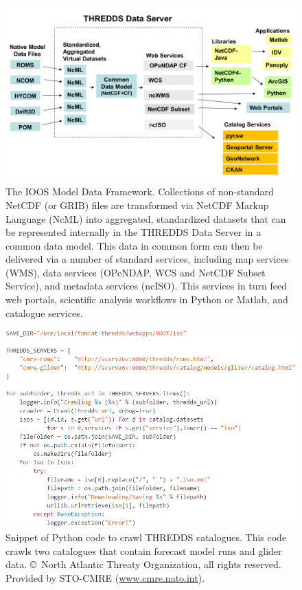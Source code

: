 \documentclass[osd, online, hvmath]{copernicus}
\begin{document}
\begin{figure}
\includegraphics[width=130mm]{framework_slide.png}
\caption{The IOOS Model Data Framework.  Collections of non-standard NetCDF (or GRIB) files are transformed via NetCDF Markup Language (NcML) into aggregated, standardized datasets that can be represented internally in the THREDDS Data Server in a common data model.  This data in common form can then be delivered via a number of standard services, including map services (WMS), data services (OPeNDAP, WCS and NetCDF Subset Service), and metadata services (ncISO).  This services in turn feed web portals, scientific analysis workflows in Python or Matlab,  and catalogue services. }
\label{osd-2015-0064-f00.pdf}
\end{figure}


\begin{figure}
\includegraphics[width=130mm]{os-2015-64-discussions-f01.png}
\caption{Snippet of Python code to crawl THREDDS catalogues. This code
  crawls two catalogues that contain forecast model runs and glider
  data. \copyright~North Atlantic Threaty Organization, all rights reserved. Provided by STO-CMRE (\url{www.cmre.nato.int}).}
\label{osd-2015-0064-f01.pdf}
\end{figure}
\end{document}

